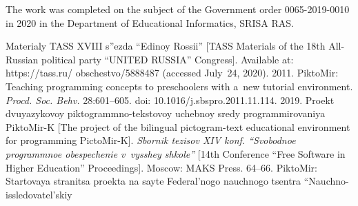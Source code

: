 


\Ack
\noindent
The work was completed on the subject of the Government order 0065-2019-0010 
in 2020 in the Department 
of Educational Informatics, SRISA RAS.


 \begin{multicols}{2}

\renewcommand{\bibname}{\protect\rmfamily References}

{\small\frenchspacing
 {%
 \begin{thebibliography}{9}
Materialy TASS XVIII s''ezda ``Edinoy Rossii'' [TASS Materials of 
the 18th All-Russian political party 
``UNITED RUSSIA'' Congress]. Available at: {\sf https://tass.ru/
obschestvo/5888487} (accessed July~24, 
2020).
 2011. PiktoMir: Teaching programming concepts to 
preschoolers with a~new tutorial environment. 
\textit{Procd. Soc. Behv.}  28:601--605.  doi: 10.1016/j.sbspro.2011.11.114.
 2019. Proekt 
dvuyazykovoy piktogrammno-tekstovoy uchebnoy sredy programmirovaniya 
PiktoMir-K [The project of the 
bilingual pictogram-text educational environment for programming PictoMir-K]. 
\textit{Sbornik tezisov 
XIV konf. ``Svobodnoe 
programmnoe obespechenie v~vysshey shkole''} [14th Conference 
``Free Software in Higher Education'' Proceedings]. Moscow: MAKS Press. 64--66.
PiktoMir: Startovaya stranitsa proekta na sayte Fe\-de\-ral'\-no\-go 
nauchnogo tsentra  
``Nauchno-issledovatel'skiy\linebreak\vspace*{-12pt}

\columnbreak


\end{thebibliography}}}
\end{multicols}
